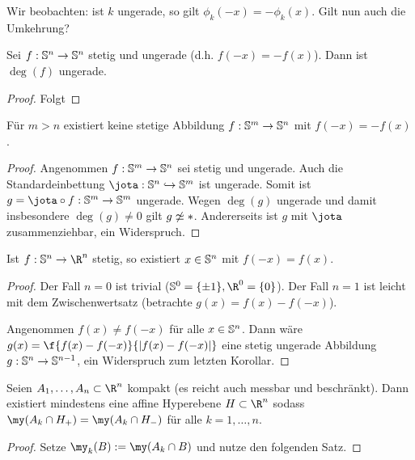 Wir beobachten: ist $k$ ungerade, so gilt $\phi_k(-x) = -\phi_k(x)$.
Gilt nun auch die Umkehrung?

\begin{st}
	Sei $f: \S^n \to \S^n$ stetig und ungerade (d.h. $f(-x) = -f(x)$).
	Dann ist $\deg(f)$ ungerade.
	\begin{proof}
		Folgt
	\end{proof}
\end{st}


\begin{kor}
	Für $m > n$ existiert keine stetige Abbildung $f: \S^m \to \S^n$ mit $f(-x) = -f(x)$.
	\begin{proof}
		Angenommen $f: \S^m \to \S^n$ sei stetig und ungerade.
		Auch die Standardeinbettung $\jota: \S^n \injto \S^m$ ist ungerade.
		Somit ist $g = \jota \circ f: \S^m \to \S^m$ ungerade.
		Wegen $\deg(g)$ ungerade und damit insbesondere $\deg(g) \neq 0$ gilt $g \not\homotopic *$.
		Andererseits ist $g$ mit $\jota$ zusammenziehbar, ein Widerspruch.
	\end{proof}
\end{kor}

\begin{kor}
	Ist $f: \S^n \to \R^n$ stetig, so existiert $x \in \S^n$ mit $f(-x) = f(x)$.
	\begin{proof}
		Der Fall $n = 0$ ist trivial ($\S^0 = \{\pm 1\}, \R^0 = \{0\}$).
		Der Fall $n = 1$ ist leicht mit dem Zwischenwertsatz (betrachte $g(x) = f(x) - f(-x)$).

		Angenommen $f(x) \neq f(-x)$ für alle $x \in \S^n$.
		Dann wäre $g(x) = \f {f(x) - f(-x)}{|f(x) - f(-x)|}$ eine stetig ungerade Abbildung $g: \S^n \to \S^{n-1}$, ein Widerspruch zum letzten Korollar.
	\end{proof}
\end{kor}

\begin{st}
	Seien $A_1, \dotsc, A_n \subset \R^n$ kompakt (es reicht auch messbar und beschränkt).
	Dann existiert mindestens eine affine Hyperebene $H \subset \R^n$ sodass $\my(A_k \cap H_+) = \my(A_k \cap H_-)$ für alle $k = 1, \dotsc, n$.
	\begin{proof}
		Setze $\my_k(B) := \my(A_k \cap B)$ und nutze den folgenden Satz.
	\end{proof}
\end{st}

